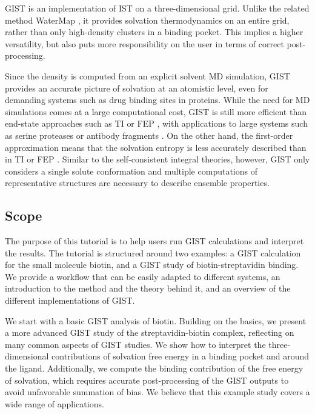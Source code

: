 \documentclass[9pt,tutorial]{livecoms}
\begin{document}
GIST is an implementation of IST on a three-dimensional grid. Unlike the related method WaterMap \cite{Abel2008-watermap,Young2007-watermap}, it provides solvation thermodynamics on an entire grid, rather than only high-density clusters in a binding pocket.
This implies a higher versatility, but also puts more responsibility on the user in terms of correct post-processing.

Since the density is computed from an explicit solvent MD simulation, GIST provides an accurate picture of solvation at an atomistic level, even for demanding systems such as drug binding sites in proteins.
While the need for MD simulations comes at a large computational cost, GIST is still more efficient than end-state approaches such as TI \cite{Kirkwood1935-ti} or FEP \cite{Zwanzig1954-reweighting}, with applications to large systems such as serine proteases \cite{Kraml2019-gigist} or antibody fragments \cite{Waibl2021-gist-antibodies}.
On the other hand, the first-order approximation means that the solvation entropy is less accurately described than in TI or FEP \cite{Chen2021,Waibl2021-gist-salt}. Similar to the self-consistent integral theories, however, GIST only considers a single solute conformation and  multiple computations of representative structures are necessary to describe ensemble properties. 


\subsection{Scope}
The purpose of this tutorial is to help users run GIST calculations and interpret the results.
The tutorial is structured around two examples: a GIST calculation for the small molecule biotin, and a GIST study of biotin-streptavidin binding.
We provide a workflow that can be easily adapted to different systems, an introduction to the method and the theory behind it, and an overview of the different implementations of GIST.

We start with a basic GIST analysis of biotin.
Building on the basics, we present a more advanced GIST study of the streptavidin-biotin complex, reflecting on many common aspects of GIST studies.
We show how to interpret the three-dimensional contributions of solvation free energy in a binding pocket and around the ligand.
Additionally, we compute the binding contribution of the free energy of solvation, which requires accurate post-processing of the GIST outputs to avoid unfavorable summation of bias.
We believe that this example study covers a wide range of applications.
\end{document}
